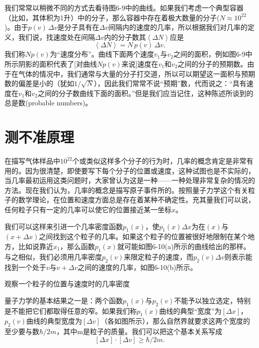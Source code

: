 \documentclass[12pt,oneside]{book}
\begin{document}
\begin{common-format}
我们常常以稍微不同的方式去看待图6-9中的曲线。如果我们考虑一个典型容器（比如，其体积为1升）中的分子，那么容器中存在着极大数量的分子($N\approx10^{22}$)。由于$p(v)\,\Delta v$是分子具有在$\Delta v$间隔内的速度的几率，所以根据我们对几率的定义，我们说，找速度处在间隔$\Delta v$内的分子数其$\left <\Delta N \right >$应是
\begin{equation}
\label{Eq:I:6:21}
\left <\Delta N\right >=N\,p(v)\,\Delta v.
\end{equation}
我们称$Np(v)$为“速度分布”。曲线下面两个速度$v_1$与$v_2$之间的面积，例如图6-9中所示阴影的面积代表了[对曲线$Np(v)$来说]速度在$v_1$和$v_2$之间的分子的预期数。由于在气体的情况中，我们通常与大量的分子打交道，所以可以期望这一面积与预期数的偏差是小的（犹如$1/\sqrt{N}$），因此我们常常不说“预期”数，代而说之：“具有速度在$v_1$和$v_2$之间的分子数曲线下面的面积。”但是我们应当记住，这种陈述所谈到的总是数(probable numbers)。


\section{测不准原理}
在描写气体样品中$10^{22}$个或类似这样多个分子的行为时，几率的概念肯定是非常有用的。因为很清楚，即使要写下每个分子的位置或速度，这种试图也是不实际的，当几率最初运用这类问题时，大家曾认为这是一种——一种处理非常复杂的情况的方法。现在我们认为，几率的概念是描写原子事件所的。按照量子力学这个有关粒子的数学理论，在位置和速度方面总是存在着某种不确定性。充其量我们可以说，任何粒子只有一定的几率可以使它的位置接近某一坐标$x$。

我们可以这样来引进一个几率密度函数$p_1(x)$，使$p_1(x)\Delta x$为在$(x)$与$(x+\Delta x)$之间找到这个粒子的几率。如果这个粒子的位置被很好地限制在某个地方，比如说靠近$x_1$，那么函数$p_1(x)$就可能如图6-10(a)所示的曲线给出的那样。与之相似，我们必须用几率密度$p_2(v)$来限定粒子的速度，而$p_2(v)\Delta v$则表示能找到一个处于$v$与$v+\Delta v$之间的速度的几率，如图6-10(b)所示。
\begin{fig}{观察一个粒子的位置与速度时的几率密度}
\caption{观察一个粒子的位置与速度时的几率密度}
\label{fig:观察一个粒子的位置与速度时的几率密度}
\end{fig}

量子力学的基本结果之一是：两个函数$p_1(x)$与$p_2(v)$不能予以独立选定，特别是不能把它们都取得任意的窄。如果我们称$p_1(x)$曲线的典型“宽度”为$[\Delta x]$，$p_2(v)$曲线的典型宽度为$[\Delta v]$（各如图所示），那么自然界就要求这两个宽度的至少要与数$\hbar/2m$，其中m是粒子的质量。我们可以把这个基本关系写成
\begin{equation}
\label{Eq:I:6:22}
[\Delta x]\cdot[\Delta v]\geq\hbar/2m.
\end{equation}


\end{common-format}
\end{document}
